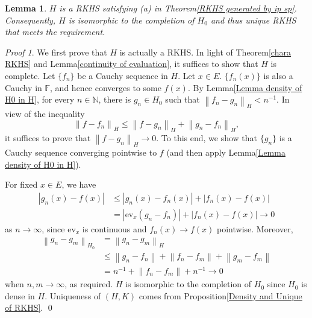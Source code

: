 \documentclass[a4paper,12pt]{article}
\newtheorem{lem}[thm]{Lemma}
\theoremstyle{remark}
\newtheorem*{prf}{Proof}
\theoremstyle{definition}
\theoremstyle{definition}
\theoremstyle{definition}
\newcommand{\abs}[1]{\left| #1 \right|}
\newcommand{\norm}[1]{\left\| #1 \right\|}
\newcommand{\ev}[1]{\mathrm{ev}_{#1}}
\begin{document}
\begin{lem}
	\( H \) is a RKHS satisfying (a) in Theorem\ref{RKHS generated by ip sp}. Consequently, \( H \) is isomorphic to the completion of \( H_0 \) and thus unique RKHS that meets the requirement.
\end{lem}
\begin{prf}
	We first prove that \( H \) is actually a RKHS. In light of Theorem\ref{chara RKHS} and Lemma\ref{continuity of evaluation}, it suffices to show that \( H \) is complete. Let \( \{f_n\} \) be a Cauchy sequence in \( H \). Let \( x \in E \). \( \{f_n(x)\} \) is also a Cauchy in \( \mathbb{F} \), and hence converges to some \( f(x) \). By Lemma\ref{Lemma density of H0 in H}, for every \( n \in \mathbb{N} \), there is \( g_n \in H_0 \) such that \( \norm{f_n-g_n}_H < n ^{-1}\). In view of the inequality
	\begin{equation*}
		\norm{f-f_n}_H \le \norm{f-g_n}_H + \norm{g_n- f_n}_H,
	\end{equation*}
	it suffices to prove that \( \norm{f-g_n}_H \to 0 \). To this end, we show that \( \{g_n\} \) is a Cauchy sequence converging pointwise to \( f \) (and then apply Lemma\ref{Lemma density of H0 in H}).

	For fixed \( x \in E \), we have
	\begin{equation*}
		\begin{aligned}
			\abs{g_n(x)-f(x)} & \le \abs{g_n(x)-f_n(x)} + \abs{f_n(x)-f(x)}       \\
			                  & = \abs{\ev{x}(g_n-f_n)} + \abs{f_n(x)-f(x)} \to 0
		\end{aligned}
	\end{equation*}
	as \( n \to \infty \), since \( \ev{x} \) is continuous and \( f_n(x)\to f(x) \) pointwise. Moreover,
	\begin{equation*}
		\begin{aligned}
			\norm{g_n-g_m}_{H_0} & = \norm{g_n-g_m}_{H}                                 \\
			                     & \le \norm{g_n-f_n} + \norm{f_n-f_m} + \norm{g_m-f_m} \\
			                     & = n ^{-1} + \norm{f_n-f_m} + n ^{-1} \to 0
		\end{aligned}
	\end{equation*}
	when \( n,m \to \infty \), as required. \( H \) is isomorphic to the completion of \( H_0 \) since \( H_0 \) is dense in \( H \). Uniqueness of \( (H,K) \) comes from Proposition\ref{Density and Unique of RKHS}.
	\qed\end{prf}
\end{document}
